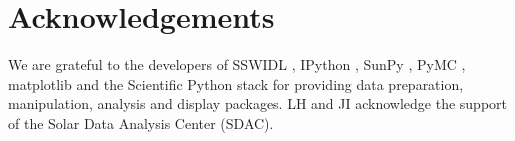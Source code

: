 \section{Acknowledgements}
We are grateful to the developers of SSWIDL \citep{ssw}, IPython
\citep{ipython}, SunPy \citep{mumford-proc-scipy-2013}, PyMC
\citep{pymc2010}, matplotlib \citep{Hunter:2007:matplotlib} and the
Scientific Python stack for providing data preparation, manipulation,
analysis and display packages.  LH and JI acknowledge the support of
the Solar Data Analysis Center (SDAC).

